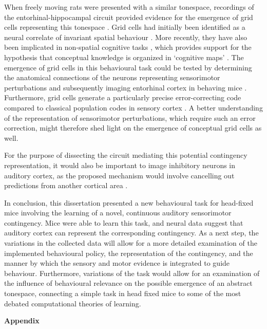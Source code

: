\documentclass[]{report}
\theoremstyle{definition}
\theoremstyle{definition}
\theoremstyle{definition}
\theoremstyle{remark}
\begin{document}
When freely moving rats were presented with a similar tonespace,
recordings of the entorhinal-hippocampal circuit provided evidence for
the emergence of grid cells representing this tonespace
\citep{aronov2017grid}. Grid cells had initially been identified as a
neural correlate of invariant spatial behaviour \citep{hafting2005grid}.
More recently, they have also been implicated in non-spatial cognitive
tasks \citep{constantinescu2016grid}, which provides support for the
hypothesis that conceptual knowledge is organized in `cognitive maps'
\citep{tolman1948map}. The emergence of grid cells in this behavioural
task could be tested by determining the anatomical connections of the
neurons representing sensorimotor perturbations and subsequently imaging
entorhinal cortex in behaving mice \citep{low2014entorhinal}.
Furthermore, grid cells generate a particularly precise error-correcting
code compared to classical population codes in sensory cortex
\citep{sreenivasan2011grid}. A better understanding of the
representation of sensorimotor perturbations, which require such an
error correction, might therefore shed light on the emergence of
conceptual grid cells as well.

For the purpose of dissecting the circuit mediating this potential
contingency representation, it would also be important to image
inhibitory neurons in auditory cortex, as the proposed mechanism would
involve cancelling out predictions from another cortical area
\citep{larkum1999inhibition}.

In conclusion, this dissertation presented a new behavioural task for
head-fixed mice involving the learning of a novel, continuous auditory
sensorimotor contingency. Mice were able to learn this task, and neural
data suggest that auditory cortex can represent the corresponding
contingency. As a next step, the variations in the collected data will
allow for a more detailed examination of the implemented behavioural
policy, the representation of the contingency, and the manner by which
the sensory and motor evidence is integrated to guide behaviour.
Furthermore, variations of the task would allow for an examination of
the influence of behavioural relevance on the possible emergence of an
abstract tonespace, connecting a simple task in head fixed mice to some
of the most debated computational theories of learning.

\hypertarget{appendix-appendix}{%
\appendix}


\pagebreak
\phantom{M}
\vfill
\begin{Huge}
\textbf{Appendix}
\end{Huge}
\vfill
\thispagestyle{empty}
\end{document}
